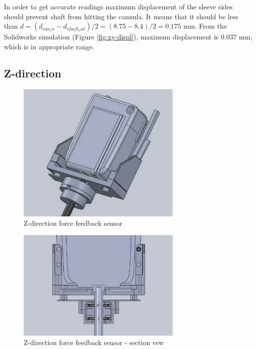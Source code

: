 In order to get accurate readings maximum displacement of the sleeve sides should prevent shaft from hitting the cannula. It means that it should be less than $d=(d_{can_in} - d_{shaft_out})/2 = (8.75 - 8.4)/2 = 0.175$ mm. From the Solidworks simulation (Figure \ref{fig:xy-displ}), maximum displacement is 0.037 mm, which is in appropriate range.

\subsection{Z-direction}
\label{sec:zDir}

\begin{figure}[h]
	\begin{center}
		\includegraphics[width=80mm]{fig/methods/z_dir_design.png}
	\end{center}
	\vspace{-4mm}
	\caption[Z-direction force feedback sensor]
	{Z-direction force feedback sensor}
	\label{fig:Z-direction}
	\vspace{-2mm}
\end{figure}

\begin{figure}[h]
	\begin{center}
		\includegraphics[width=80mm]{fig/methods/z_dir_sec.png}
	\end{center}
	\vspace{-4mm}
	\caption[Z-direction force feedback sensor - section vew]
	{Z-direction force feedback sensor - section vew}
	\label{fig:Z-direction_sec}
	\vspace{-2mm}
\end{figure}


